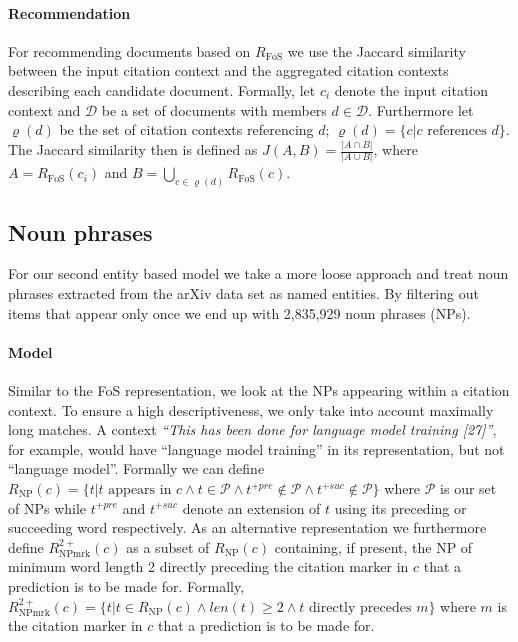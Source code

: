 \paragraph{Recommendation} For recommending documents based on $R_{\text{FoS}}$ we use the Jaccard similarity between the input citation context and the aggregated citation contexts describing each candidate document. Formally, let $c_i$ denote the input citation context and $\mathcal{D}$ be a set of documents with members $d\in \mathcal{D}$. Furthermore let $\varrho(d)$ be the set of citation contexts referencing $d$; ${\varrho(d)=\{c|c\text{ references } d\}}$. The Jaccard similarity then is defined as ${J(A,B)=\frac{|A\cap B|}{|A\cup B|}}$, where $A = R_{\text{FoS}}(c_i)$ and $B=\bigcup\limits_{c \in \varrho(d)} R_{\text{FoS}}(c)$.

\subsection{Noun phrases}\label{sec:npmodel}
For our second entity based model we take a more loose approach and treat noun phrases extracted from the arXiv data set as named entities. By filtering out items that appear only once we end up with 2,835,929 noun phrases (NPs).

\paragraph{Model} Similar to the FoS representation, we look at the NPs appearing within a citation context. To ensure a high descriptiveness, we only take into account maximally long matches. A context \emph{``This has been done for language model training [27]''}, for example, would have ``language model training'' in its representation, but not ``language model''. Formally we can define ${R_{\text{NP}}(c) = \{t|t\text{ appears in }c \land t\in \mathcal{P} \land t^{+pre} \notin \mathcal{P}\land t^{+suc} \notin \mathcal{P}\}}$ where $\mathcal{P}$ is our set of NPs while $t^{+pre}$ and $t^{+suc}$ denote an extension of $t$ using its preceding or succeeding word respectively. As an alternative representation we furthermore define ${R_{\text{NPmrk}}^{2+}(c)}$ as a subset of ${R_{\text{NP}}(c)}$ containing, if present, the NP of minimum word length 2 directly preceding the citation marker in $c$ that a prediction is to be made for. Formally, ${R_{\text{NPmrk}}^{2+}(c) = \{t|t\in R_{\text{NP}}(c)\land len(t)\geq 2 \land t\text{ directly precedes } m\}}$ where $m$ is the citation marker in $c$ that a prediction is to be made for.

